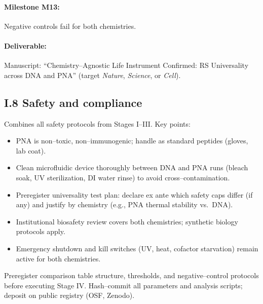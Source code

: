 \documentclass[11pt]{article}
\begin{document}
\paragraph{Milestone M13:} Negative controls fail for both chemistries.

\paragraph{Deliverable:} Manuscript: ``Chemistry–Agnostic Life Instrument Confirmed: RS Universality across DNA and PNA'' (target \emph{Nature}, \emph{Science}, or \emph{Cell}).

\subsection*{I.8 Safety and compliance}

Combines all safety protocols from Stages I–III. Key points:
\begin{itemize}
\item PNA is non–toxic, non–immunogenic; handle as standard peptides (gloves, lab coat).
\item Clean microfluidic device thoroughly between DNA and PNA runs (bleach soak, UV sterilization, DI water rinse) to avoid cross–contamination.
\item Preregister universality test plan: declare ex ante which safety caps differ (if any) and justify by chemistry (e.g., PNA thermal stability vs.\ DNA).
\item Institutional biosafety review covers both chemistries; synthetic biology protocols apply.
\item Emergency shutdown and kill switches (UV, heat, cofactor starvation) remain active for both chemistries.
\end{itemize}

Preregister comparison table structure, thresholds, and negative–control protocols before executing Stage IV. Hash–commit all parameters and analysis scripts; deposit on public registry (OSF, Zenodo).
\end{document}
